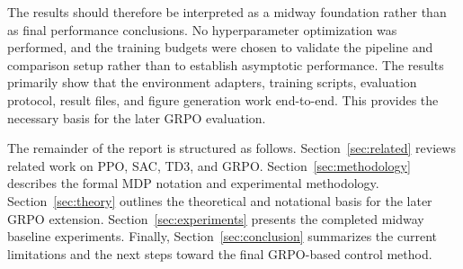 The results should therefore be interpreted as a midway foundation rather than as final performance conclusions. No hyperparameter optimization was performed, and the training budgets were chosen to validate the pipeline and comparison setup rather than to establish asymptotic performance. The results primarily show that the environment adapters, training scripts, evaluation protocol, result files, and figure generation work end-to-end. This provides the necessary basis for the later GRPO evaluation.

The remainder of the report is structured as follows. Section~\ref{sec:related} reviews related work on PPO, SAC, TD3, and GRPO. Section~\ref{sec:methodology} describes the formal MDP notation and experimental methodology. Section~\ref{sec:theory} outlines the theoretical and notational basis for the later GRPO extension. Section~\ref{sec:experiments} presents the completed midway baseline experiments. Finally, Section~\ref{sec:conclusion} summarizes the current limitations and the next steps toward the final GRPO-based control method.